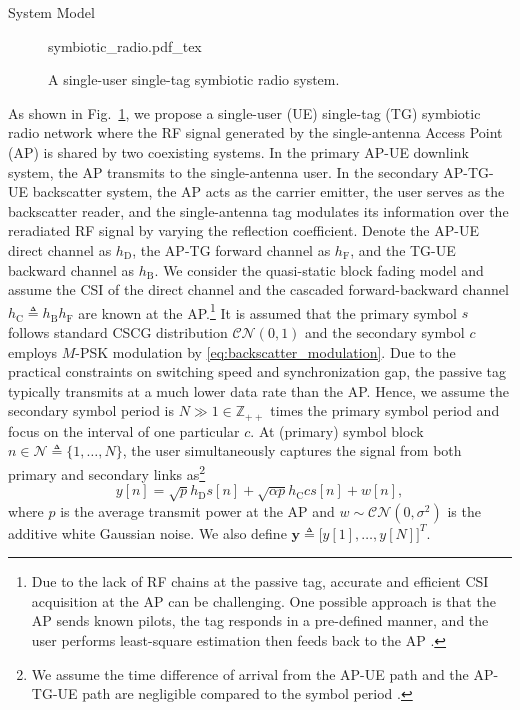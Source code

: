 \documentclass[journal]{IEEEtran}
\begin{document}
	\begin{section}{System Model}
		\begin{figure}[!t]
			\centering
			\def\svgwidth{0.9\columnwidth}
			{symbiotic_radio.pdf_tex}
			\caption{A single-user single-tag symbiotic radio system.}
			\label{fi:symbiotic_radio}
		\end{figure}
		As shown in Fig.~\ref{fi:symbiotic_radio}, we propose a single-user (UE) single-tag (TG) symbiotic radio network where the RF signal generated by the single-antenna Access Point (AP) is shared by two coexisting systems. In the primary AP-UE downlink system, the AP transmits to the single-antenna user. In the secondary AP-TG-UE backscatter system, the AP acts as the carrier emitter, the user serves as the backscatter reader, and the single-antenna tag modulates its information over the reradiated RF signal by varying the reflection coefficient. Denote the AP-UE direct channel as $h_{\mathrm{D}}$, the AP-TG forward channel as $h_{\mathrm{F}}$, and the TG-UE backward channel as $h_{\mathrm{B}}$. We consider the quasi-static block fading model and assume the CSI of the direct channel and the cascaded forward-backward channel $h_{\mathrm{C}} \triangleq h_{\mathrm{B}} h_{\mathrm{F}}$ are known at the AP.\footnote{Due to the lack of RF chains at the passive tag, accurate and efficient CSI acquisition at the AP can be challenging. One possible approach is that the AP sends known pilots, the tag responds in a pre-defined manner, and the user performs least-square estimation then feeds back to the AP \cite{Bharadia2015,Yang2015b,Guo2019e}.} It is assumed that the primary symbol $s$ follows standard CSCG distribution $\mathcal{CN}(0,1)$ and the secondary symbol $c$ employs $M$-PSK modulation by \eqref{eq:backscatter_modulation}. Due to the practical constraints on switching speed and synchronization gap, the passive tag typically transmits at a much lower data rate than the AP. Hence, we assume the secondary symbol period is $N \gg 1 \in \mathbb{Z}_{++}$ times the primary symbol period and focus on the interval of one particular $c$. At (primary) symbol block $n \in \mathcal{N} \triangleq \{1,\ldots,N\}$, the user simultaneously captures the signal from both primary and secondary links as\footnote{We assume the time difference of arrival from the AP-UE path and the AP-TG-UE path are negligible compared to the symbol period \cite{Guo2019b,Liang2020,Long2020a}.}
		\begin{equation}
			y[n] = \sqrt{p} h_{\mathrm{D}} s[n] + \sqrt{\alpha p} h_{\mathrm{C}} c s[n] + w[n],
		\end{equation}
		where $p$ is the average transmit power at the AP and $w \sim \mathcal{CN}(0,\sigma^2)$ is the additive white Gaussian noise. We also define $\boldsymbol{y} \triangleq \bigl[y[1], \ldots, y[N]\bigr]^T$.


\end{section}
\end{document}
